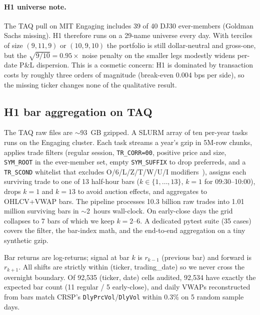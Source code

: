\documentclass[10pt,conference,compsoc]{IEEEtran}
\begin{document}
\paragraph{H1 universe note.}
\label{sec:h1-note}
The TAQ pull on MIT Engaging includes 39 of 40 DJ30 ever-members
(Goldman Sachs missing). H1 therefore runs on a 29-name universe
every day. With terciles of size $(9, 11, 9)$ or $(10, 9, 10)$ the
portfolio is still dollar-neutral and gross-one, but the
$\sqrt{9/10} = 0.95\times$ noise penalty on the smaller legs
modestly widens per-date P\&L dispersion. This is a cosmetic concern:
H1 is dominated by transaction costs by roughly three orders of
magnitude (break-even 0.004 bps per side), so the missing ticker
changes none of the qualitative result.

\subsection{H1 bar aggregation on TAQ}

The TAQ raw files are $\sim$93~GB gzipped. A SLURM array of ten
per-year tasks runs on the Engaging cluster. Each task streams a
year's gzip in 5M-row chunks, applies trade filters (regular session,
\texttt{TR\_CORR=00}, positive price and size, \texttt{SYM\_ROOT}
in the ever-member set, empty \texttt{SYM\_SUFFIX} to drop
preferreds, and a \texttt{TR\_SCOND} whitelist that excludes
O/6/L/Z/T/W/U/I modifiers~\cite{nysetaq}), assigns each surviving
trade to one of 13 half-hour bars ($k \in\{1,\ldots,13\}$, $k{=}1$
for 09:30--10:00), drops $k{=}1$ and $k{=}13$ to avoid auction
effects, and aggregates to OHLCV+VWAP bars. The pipeline processes
10.3 billion raw trades into 1.01 million surviving bars in
$\sim$2~hours wall-clock. On early-close days the grid collapses
to 7 bars of which we keep $k{=}2$--$6$. A dedicated pytest suite
(35 cases) covers the filter, the bar-index math, and the
end-to-end aggregation on a tiny synthetic gzip.

Bar returns are log-returns; signal at bar $k$ is
$r_{k{-}1}$ (previous bar) and forward is $r_{k{+}1}$. All shifts
are strictly within (ticker, trading\_date) so we never cross the
overnight boundary. Of 92{,}535 (ticker, date) cells audited,
92{,}534 have exactly the expected bar count (11 regular / 5
early-close), and daily VWAPs reconstructed from bars match
CRSP's \texttt{DlyPrcVol}/\texttt{DlyVol} within 0.3\% on 5 random
sample days.
\end{document}
